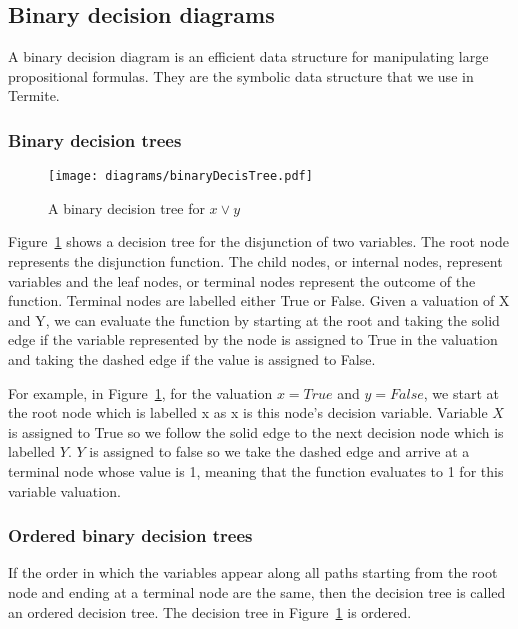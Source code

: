 
\subsection{Binary decision diagrams}

A binary decision diagram is an efficient data structure for manipulating large propositional formulas. They are the symbolic data structure that we use in Termite.

\subsubsection{Binary decision trees}

\begin{figure}[t]
\centering
\texttt{[image: diagrams/binaryDecisTree.pdf]}
\caption{A binary decision tree for $x \vee y$}
\label{fig:decis_tree}
\end{figure}

Figure~\ref{fig:decis_tree} shows a decision tree for the disjunction of two variables. The root node represents the disjunction function. The child nodes, or internal nodes, represent variables and the leaf nodes, or terminal nodes represent the outcome of the function. Terminal nodes are labelled either True or False. Given a valuation of X and Y, we can evaluate the function by starting at the root and taking the solid edge if the variable represented by the node is assigned to True in the valuation and taking the dashed edge if the value is assigned to False. 

For example, in Figure~\ref{fig:decis_tree}, for the valuation $x=True$ and $y=False$, we start at the root node which is labelled x as x is this node's decision variable. Variable $X$ is assigned to True so we follow the solid edge to the next decision node which is labelled $Y$. $Y$ is assigned to false so we take the dashed edge and arrive at a terminal node whose value is 1, meaning that the function evaluates to 1 for this variable valuation.

\subsubsection{Ordered binary decision trees}

If the order in which the variables appear along all paths starting from the root node and ending at a terminal node are the same, then the decision tree is called an ordered decision tree. The decision tree in Figure~\ref{fig:decis_tree} is ordered.

